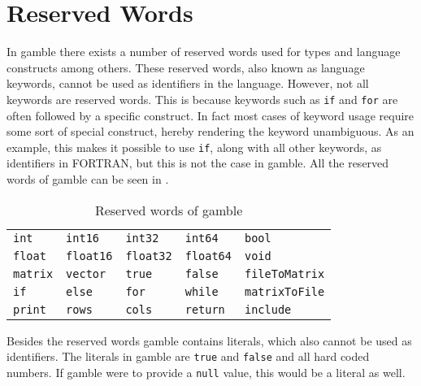 \section{Reserved Words}
\label{sec:reserved_words}
In \gls{gamble} there exists a number of reserved words used for types and language constructs among others.
These reserved words, also known as language keywords, cannot be used as identifiers in the language. 
However, not all keywords are reserved words.
This is because keywords such as \texttt{if} and \texttt{for} are often followed by a specific construct.
In fact most cases of keyword usage require some sort of special construct, hereby rendering the keyword unambiguous.
As an example, this makes it possible to use \texttt{if}, along with all other keywords, as identifiers in FORTRAN, but this is not the case in \gls{gamble}. \citep{fortran_identifiers}
All the reserved words of \gls{gamble} can be seen in .
\begin{table}[h!]
	\centering
	\def\arraystretch{1.5} \setlength{\tabcolsep}{2em}
	\begin{tabular}{l l l l l}
        \texttt{int}     & \texttt{int16}     & \texttt{int32}     & \texttt{int64}     & \texttt{bool}    \\
        \texttt{float}   & \texttt{float16}   & \texttt{float32}   & \texttt{float64}   & \texttt{void}    \\
        \texttt{matrix}  & \texttt{vector}    & \texttt{true}      & \texttt{false}     & \texttt{fileToMatrix} \\
        \texttt{if}      & \texttt{else}      & \texttt{for}       & \texttt{while}     & \texttt{matrixToFile} \\
        \texttt{print}   & \texttt{rows}      & \texttt{cols}      & \texttt{return}    & \texttt{include} \\
    \end{tabular}
    \caption{Reserved words of \gls{gamble}}\label{res:words}
	\def\arraystretch{1}
\end{table}

Besides the reserved words \gls{gamble} contains literals, which also cannot be used as identifiers.
The literals in \gls{gamble} are \texttt{true} and \texttt{false} and all hard coded numbers.
If \gls{gamble} were to provide a \texttt{null} value, this would be a literal as well.

